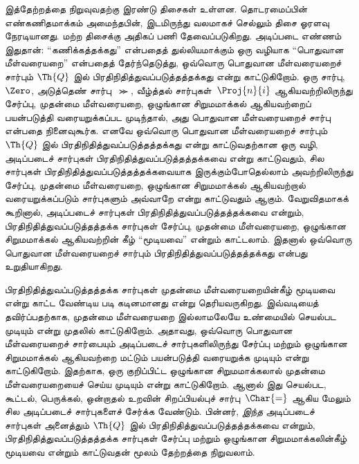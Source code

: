 \documentclass[../../../include/open-logic-section]{subfiles}
\begin{document}
இத்தேற்றத்தை நிறுவுவதற்கு இரண்டு திசைகள் உள்ளன. தொடரமைப்பின்
எண்கணிதமாக்கம் அமைந்தபின், இடமிருந்து வலமாகச் செல்லும் திசை ஓரளவு
நேரடியானது. மற்ற திசைக்கு அதிகப் பணி தேவைப்படுகிறது. அடிப்படை எண்ணம்
இதுதான்: ``கணிக்கத்தக்கது'' என்பதைத் துல்லியமாக்கும் ஒரு வழியாக
``பொதுவான மீள்வரையறை'' என்பதைத் தேர்ந்தெடுத்து, ஒவ்வொரு பொதுவான
மீள்வரையறைச் சார்பும் $\Th{Q}$ இல் பிரதிநிதித்துவப்படுத்தத்தக்கது என்று
காட்டுகிறோம். ஒரு சார்பு, $\Zero$, அடுத்தெண் சார்பு~$\Succ$, வீழ்த்தல்
சார்புகள்~$\Proj{n}{i}$ ஆகியவற்றிலிருந்து சேர்ப்பு, முதன்மை மீள்வரையறை,
ஒழுங்கான சிறுமமாக்கல் ஆகியவற்றைப் பயன்படுத்தி வரையறுக்கப்பட முடிந்தால்,
அது பொதுவான மீள்வரையறைச் சார்பு என்பதை நினைவுகூர்க. எனவே ஒவ்வொரு பொதுவான
மீள்வரையறைச் சார்பும் $\Th{Q}$ இல் பிரதிநிதித்துவப்படுத்தத்தக்கது என்று
காட்டுவதற்கான ஒரு வழி, அடிப்படைச் சார்புகள் பிரதிநிதித்துவப்படுத்தத்தக்கவை
என்று காட்டுவதும், சில சார்புகள் பிரதிநிதித்துவப்படுத்தத்தக்கவையாக
இருக்கும்போதெல்லாம் அவற்றிலிருந்து சேர்ப்பு, முதன்மை மீள்வரையறை, ஒழுங்கான
சிறுமமாக்கல் ஆகியவற்றால் வரையறுக்கப்படும் சார்புகளும் அவ்வாறே என்று
காட்டுவதும் ஆகும். வேறுவிதமாகக் கூறினால், அடிப்படைச் சார்புகள்
பிரதிநிதித்துவப்படுத்தத்தக்கவை என்றும், பிரதிநிதித்துவப்படுத்தத்தக்க
சார்புகள் சேர்ப்பு, முதன்மை மீள்வரையறை, ஒழுங்கான சிறுமமாக்கல் ஆகியவற்றின்
கீழ் ``மூடியவை'' என்றும் காட்டலாம். இதனால் ஒவ்வொரு பொதுவான
மீள்வரையறைச் சார்பும் பிரதிநிதித்துவப்படுத்தத்தக்கது என்பது உறுதியாகிறது.

பிரதிநிதித்துவப்படுத்தத்தக்க சார்புகள் முதன்மை மீள்வரையறையின்கீழ் மூடியவை
என்று காட்ட வேண்டிய படி கடினமானது என்று தெரியவருகிறது. இவ்வடியைத்
தவிர்ப்பதற்காக, முதன்மை மீள்வரையறை இல்லாமலேயே உண்மையில் செயல்பட முடியும்
என்று முதலில் காட்டுகிறோம். அதாவது, ஒவ்வொரு பொதுவான மீள்வரையறைச் சார்பையும்
அடிப்படைச் சார்புகளிலிருந்து சேர்ப்பு மற்றும் ஒழுங்கான சிறுமமாக்கல்
ஆகியவற்றை மட்டும் பயன்படுத்தி வரையறுக்க முடியும் என்று காட்டுகிறோம்.
இதற்காக, ஒரு குறிப்பிட்ட ஒழுங்கான சிறுமமாக்கலால் முதன்மை மீள்வரையறையைச்
செய்ய முடியும் என்று காட்டுகிறோம். ஆனால் இது செயல்பட, கூட்டல், பெருக்கல்,
ஒன்றாதல் உறவின் சிறப்பியல்புச் சார்பு~$\Char{=}$ ஆகிய மேலும் சில
அடிப்படைச் சார்புகளைச் சேர்க்க வேண்டும். பின்னர், \emph{இந்த} அடிப்படைச்
சார்புகள் அனைத்தும் $\Th{Q}$ இல் பிரதிநிதித்துவப்படுத்தத்தக்கவை என்றும்,
பிரதிநிதித்துவப்படுத்தத்தக்க சார்புகள் சேர்ப்பு மற்றும் ஒழுங்கான
சிறுமமாக்கலின்கீழ் மூடியவை என்றும் காட்டுவதன் மூலம் தேற்றத்தை நிறுவலாம்.
\end{document}

